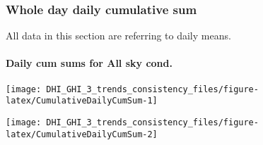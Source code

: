 \documentclass[
  10pt,
  a4paper,oneside]{article}
\begin{document}
\hypertarget{whole-day-daily-cumulative-sum}{%
\subsubsection{Whole day daily cumulative sum}\label{whole-day-daily-cumulative-sum}}

All data in this section are referring to daily means.

\newpage

\hypertarget{daily-cum-sums-for-all-sky-cond.}{%
\paragraph{Daily cum sums for All sky cond.}\label{daily-cum-sums-for-all-sky-cond.}}

\begin{center}\texttt{[image: DHI\_GHI\_3\_trends\_consistency\_files/figure-latex/CumulativeDailyCumSum-1]} \end{center}

\begin{center}\texttt{[image: DHI\_GHI\_3\_trends\_consistency\_files/figure-latex/CumulativeDailyCumSum-2]} \end{center}

\newpage

\footnotesize
\end{document}
